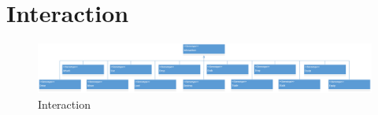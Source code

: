 \section{Interaction}
\begin{figure}
    \begin{center}
    \includegraphics[width=20cm]{10_img/Z_annexeA/interaction.PNG} 
    \caption{Interaction}
    \label{A-Interaction}
    \end{center}
\end{figure}